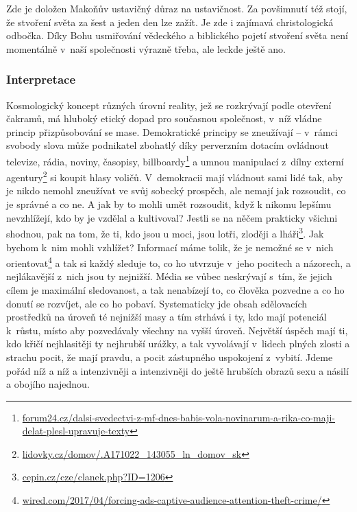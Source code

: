 \begin{enumerate}
{Zde je doložen Makoňův ustavičný důraz na ustavičnost. Za povšimnutí též stojí,
že stvoření světa za šest a jeden den lze zažít. Je zde i zajímavá
christologická odbočka. Díky Bohu usmiřování vědeckého a biblického pojetí
stvoření světa není momentálně v~naší společnosti výrazně třeba, ale leckde
ještě ano\cite{carlin2017cultures}.

}

\end{enumerate}

\subsubsection*{Interpretace}

Kosmologický koncept různých úrovní reality, jež se rozkrývají podle otevření
čakramů, má hluboký etický dopad pro současnou společnost, v~níž vládne princip
přizpůsobování se mase. Demokratické principy se zneužívají -- v~rámci svobody
slova může podnikatel zbohatlý díky perverzním dotacím ovládnout televize,
rádia, noviny, časopisy,
billboardy\footnote{\href{https://www.forum24.cz/dalsi-svedectvi-z-mf-dnes-babis-vola-novinarum-a-rika-co-maji-delat-plesl-upravuje-texty/}{forum24.cz/dalsi-svedectvi-z-mf-dnes-babis-vola-novinarum-a-rika-co-maji-delat-plesl-upravuje-texty}}
a umnou manipulací z~dílny externí
agentury\footnote{\href{https://www.lidovky.cz/domov/kdo-je-babisem-polibeny-genius-exnovinar-a-hvezda-marketingu-marek-prchal.A171022\_143055\_ln\_domov\_sk}{lidovky.cz/domov/.A171022\_143055\_ln\_domov\_sk}}
si koupit hlasy voličů. V~demokracii mají vládnout sami lidé tak, aby je nikdo
nemohl zneužívat ve svůj sobecký prospěch, ale nemají jak rozsoudit, co je
správné a co ne. A jak by to mohli umět rozsoudit, když k nikomu lepšímu
nevzhlížejí, kdo by je vzdělal a kultivoval? Jestli se na něčem prakticky
všichni shodnou, pak na tom, že ti, kdo jsou u moci, jsou lotři, zloději a
lháři\footnote{\href{http://cepin.cz/cze/clanek.php?ID=1206}{cepin.cz/cze/clanek.php?ID=1206}}.
Jak bychom k~nim mohli vzhlížet? Informací máme tolik, že je nemožné se v~nich
orientovat\footnote{\href{https://www.wired.com/2017/04/forcing-ads-captive-audience-attention-theft-crime/}{wired.com/2017/04/forcing-ads-captive-audience-attention-theft-crime/}} a tak si každý sleduje to, co ho utvrzuje v~jeho pocitech a
názorech, a nejlákavější z~nich jsou ty nejnižší. Média se vůbec neskrývají
s~tím, že jejich cílem je maximální sledovanost, a tak nenabízejí to, co člověka
pozvedne a co ho donutí se rozvíjet, ale co ho pobaví\cite{achtenhagen2014challenges}. Systematicky jde obsah
sdělovacích prostředků na úroveň té nejnižší masy a tím strhává i ty, kdo mají
potenciál k~růstu, místo aby pozvedávaly všechny na vyšší úroveň. Největší
úspěch mají ti, kdo křičí nejhlasitěji ty nejhrubší urážky, a tak vyvolávají
v~lidech plných zlosti a strachu pocit, že mají pravdu, a pocit zástupného
uspokojení z~vybití. Jdeme pořád níž a níž a intenzivněji a intenzivněji do
ještě hrubších obrazů sexu a násilí a obojího najednou.

